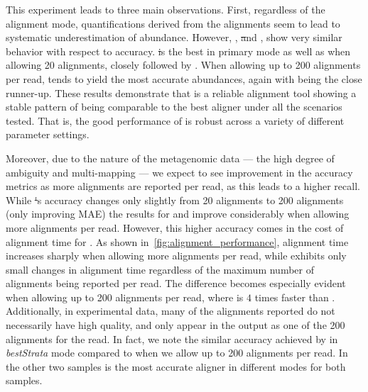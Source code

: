 This experiment leads to three main observations. First, regardless of
the alignment mode, quantifications derived from the \debga alignments seem 
to lead to systematic underestimation of abundance.
However, \puffaligner, \st and \bt, show very similar behavior with respect to accuracy. 
\st is the best in primary mode as well as when allowing 20 alignments, closely followed by 
\puffaligner.  When allowing up to 200 alignments per read, \bt tends to yield the most accurate 
abundances, again with \puffaligner being the close runner-up. 
These results demonstrate that \puffaligner is a reliable alignment tool 
showing a stable pattern of being comparable to the best aligner under all 
the scenarios tested.  That is, the good performance of \puffaligner is robust across
a variety of different parameter settings.

Moreover, due to the nature of the metagenomic data --- the high degree of
ambiguity and multi-mapping --- we expect to see improvement in the
accuracy metrics as more alignments are reported per read, as this
leads to a higher recall. While \st's accuracy changes only slightly from
20 alignments to 200 alignments (only improving MAE) the results for
\puffaligner and \bt improve considerably when allowing more alignments per
read. However, this higher accuracy comes in the cost of alignment time
for \bt. As shown in~\cref{fig:alignment_performance}, 
\bt alignment time increases sharply when allowing more
alignments per read, while \puffaligner exhibits only small changes in alignment time 
regardless of the maximum number of alignments being reported per read. 
The difference becomes especially evident when allowing up to 200 alignments per read, 
where \puffaligner is $4$ times faster than \bt. Additionally, in experimental data, many
of the alignments reported do not necessarily have high quality, and
only appear in the output as one of the 200 alignments for the read. 
In fact, we note the similar accuracy
achieved by \puffaligner in \textit{bestStrata} mode compared to 
when we allow up to 200 alignments per read. In the other two samples
\puffaligner is the most accurate aligner in different modes for both samples.

